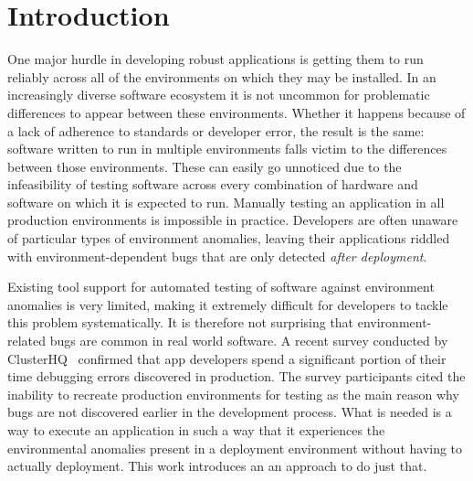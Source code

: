 \section{Introduction}

One major hurdle in developing robust applications is getting them to run reliably across all of the environments on
which they may be installed.  In an increasingly diverse software ecosystem it is not uncommon for problematic
differences to appear between these environments.  Whether it happens because of a lack of adherence to standards or
developer error, the result is the same: software written to run in multiple environments falls victim to the
differences between those environments.  These can easily go unnoticed due to the infeasibility of testing software
across every combination of hardware and software on which it is expected to run.  Manually testing an application in
all production environments is impossible in practice. Developers are often unaware of particular types of environment
anomalies, leaving their applications riddled with environment-dependent bugs that are only detected \emph{after
  deployment}.

Existing tool support for automated testing of software against environment anomalies is very limited, making it
extremely difficult for developers to tackle this problem systematically.  It is therefore not surprising that
environment-related bugs are common in real world software. A recent survey conducted by
ClusterHQ~\cite{ClusterHQSurvey} confirmed that app developers spend a significant portion of their time debugging
errors discovered in production.  The survey participants cited the inability to recreate production environments for
testing as the main reason why bugs are not discovered earlier in the development process.  What is needed is a way to
execute an application in such a way that it experiences the environmental anomalies present in a deployment environment
without having to actually deployment.  This work introduces an an approach to do just that.

